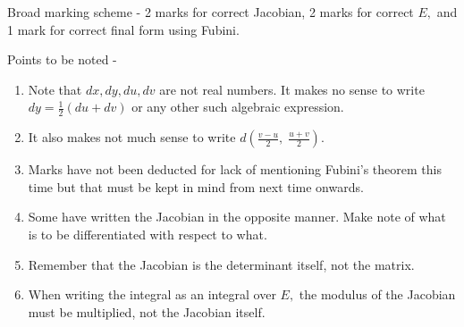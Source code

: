 \documentclass{article}
\begin{document}
\hrulefill

\vspace{0.2 cm}

Broad marking scheme - 2 marks for correct Jacobian, 2 marks for correct $E,$ and 1 mark for correct final form using Fubini.

\hrulefill

\vspace{0.2 cm}

Points to be noted -
\begin{enumerate} 
	\item Note that $dx, dy, du, dv$ are not real numbers. It makes no sense to write $dy = \frac{1}{2}(du + dv)$ or any other such algebraic expression.
	\item It also makes not much sense to write $d\left(\frac{v-u}{2},\;\frac{u+v}{2}\right).$
	\item Marks have not been deducted for lack of mentioning Fubini's theorem this time but that must be kept in mind from next time onwards.
	\item Some have written the Jacobian in the opposite manner. Make note of what is to be differentiated with respect to what.
	\item Remember that the Jacobian is the determinant itself, not the matrix.
	\item When writing the integral as an integral over $E,$ the modulus of the Jacobian must be multiplied, not the Jacobian itself.
\end{enumerate}
\end{document}
